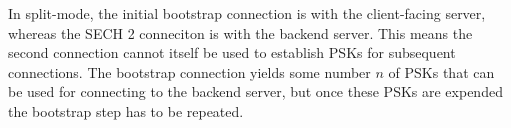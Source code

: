 In split-mode, the initial bootstrap connection is with the client-facing server, whereas
the \ac{SECH} 2 conneciton is with the backend server. This means the second connection
cannot itself be used to establish \ac{PSK}s for subsequent connections.
The bootstrap connection yields some number $n$ of \ac{PSK}s that can be used for connecting
to the backend server, but once these \ac{PSK}s are expended the bootstrap step has to be repeated.



